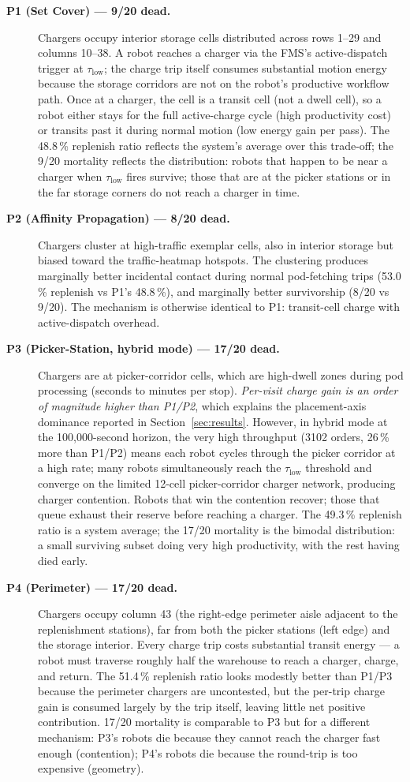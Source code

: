 \documentclass[conference]{IEEEtran}
\begin{document}
\begin{description}
  \item[\textbf{P1 (Set Cover) — 9/20 dead.}] Chargers occupy interior storage cells distributed across rows 1--29 and columns 10--38. A robot reaches a charger via the FMS's active-dispatch trigger at $\tau_\text{low}$; the charge trip itself consumes substantial motion energy because the storage corridors are not on the robot's productive workflow path. Once at a charger, the cell is a transit cell (not a dwell cell), so a robot either stays for the full active-charge cycle (high productivity cost) or transits past it during normal motion (low energy gain per pass). The 48.8\,\% replenish ratio reflects the system's average over this trade-off; the 9/20 mortality reflects the distribution: robots that happen to be near a charger when $\tau_\text{low}$ fires survive; those that are at the picker stations or in the far storage corners do not reach a charger in time.
  \item[\textbf{P2 (Affinity Propagation) — 8/20 dead.}] Chargers cluster at high-traffic exemplar cells, also in interior storage but biased toward the traffic-heatmap hotspots. The clustering produces marginally better incidental contact during normal pod-fetching trips (53.0\,\% replenish vs P1's 48.8\,\%), and marginally better survivorship (8/20 vs 9/20). The mechanism is otherwise identical to P1: transit-cell charge with active-dispatch overhead.
  \item[\textbf{P3 (Picker-Station, hybrid mode) — 17/20 dead.}] Chargers are at picker-corridor cells, which are high-dwell zones during pod processing (seconds to minutes per stop). \emph{Per-visit charge gain is an order of magnitude higher than P1/P2}, which explains the placement-axis dominance reported in Section~\ref{sec:results}. However, in hybrid mode at the 100{,}000-second horizon, the very high throughput (3102 orders, 26\,\% more than P1/P2) means each robot cycles through the picker corridor at a high rate; many robots simultaneously reach the $\tau_\text{low}$ threshold and converge on the limited 12-cell picker-corridor charger network, producing charger contention. Robots that win the contention recover; those that queue exhaust their reserve before reaching a charger. The 49.3\,\% replenish ratio is a system average; the 17/20 mortality is the bimodal distribution: a small surviving subset doing very high productivity, with the rest having died early.
  \item[\textbf{P4 (Perimeter) — 17/20 dead.}] Chargers occupy column 43 (the right-edge perimeter aisle adjacent to the replenishment stations), far from both the picker stations (left edge) and the storage interior. Every charge trip costs substantial transit energy --- a robot must traverse roughly half the warehouse to reach a charger, charge, and return. The 51.4\,\% replenish ratio looks modestly better than P1/P3 because the perimeter chargers are uncontested, but the per-trip charge gain is consumed largely by the trip itself, leaving little net positive contribution. 17/20 mortality is comparable to P3 but for a different mechanism: P3's robots die because they cannot reach the charger fast enough (contention); P4's robots die because the round-trip is too expensive (geometry).

\end{description}
\end{document}
